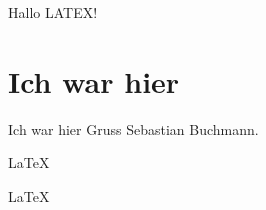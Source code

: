 \documentclass{article}
\begin{document}
Hallo LATEX!  

\section{Ich war hier}

Ich war hier Gruss Sebastian Buchmann.

\LaTeX 

\huge
\LaTeX 
   
\end{document}
